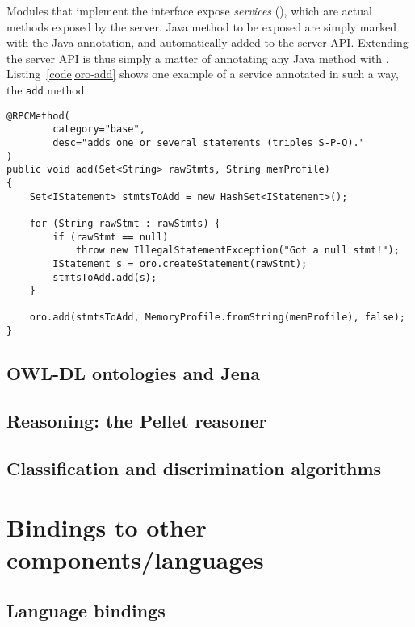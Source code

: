 Modules that implement the  interface expose
\emph{services} (), which are actual methods exposed by the
server. Java method to be exposed are simply marked with the
 Java annotation, and automatically added to the server
API. Extending the server API is thus simply a matter of annotating any Java
method with . Listing~\ref{code|oro-add} shows one
example of a service annotated in such a way, the {\tt add} method.

\lstset{language=java}
\begin{lstlisting}[caption=The {\tt add} method from ORO {\tt BaseModule}, label = code|oro-add]
@RPCMethod(
        category="base",
        desc="adds one or several statements (triples S-P-O)."
)
public void add(Set<String> rawStmts, String memProfile)
{
    Set<IStatement> stmtsToAdd = new HashSet<IStatement>();
    
    for (String rawStmt : rawStmts) {
        if (rawStmt == null)
            throw new IllegalStatementException("Got a null stmt!");
        IStatement s = oro.createStatement(rawStmt);
        stmtsToAdd.add(s);
    }
    
    oro.add(stmtsToAdd, MemoryProfile.fromString(memProfile), false);
}
\end{lstlisting}



\subsection{OWL-DL ontologies and Jena}
\label{sect|jena}

\subsection{Reasoning: the Pellet reasoner}
\label{sect|pellet}

\subsection{Classification and discrimination algorithms}
\label{sect|discrimination}

\section{Bindings to other components/languages}
\label{sect|interfacing}

\subsection{Language bindings}
\label{sect|bindings}

